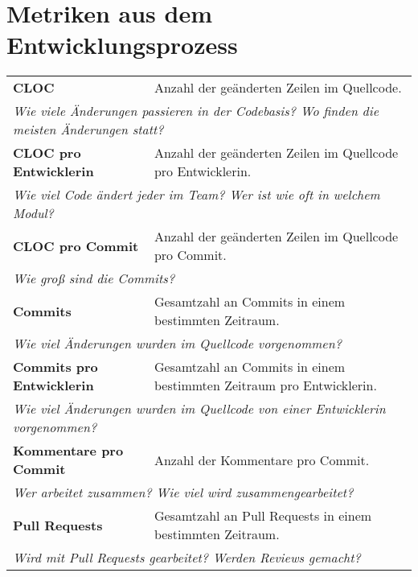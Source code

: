 \appendix
{}

\section{Metriken aus dem Entwicklungsprozess}\label{appendix:metrics}

\begin{table}[H]
    \centering
    \begin{tabular}{p{6.5cm}p{8cm}} \toprule
    \textbf{\ac{CLOC}} & Anzahl der geänderten Zeilen im Quellcode. \\
    \multicolumn{2}{p{14.5cm}}{\textit{Wie viele Änderungen passieren in der Codebasis? \newline Wo finden die meisten Änderungen statt?}} \\ \midrule
    \textbf{\ac{CLOC} pro Entwicklerin} & Anzahl der geänderten Zeilen im Quellcode pro Entwicklerin. \\ 
    \multicolumn{2}{p{14.5cm}}{\textit{Wie viel Code ändert jeder im Team? \newline  Wer ist wie oft in welchem Modul?}} \\ \midrule
    \textbf{\ac{CLOC} pro Commit} & Anzahl der geänderten Zeilen im Quellcode pro Commit. \\ 
    \multicolumn{2}{p{14.5cm}}{\textit{Wie groß sind die Commits?}} \\ \midrule
    \textbf{Commits} & Gesamtzahl an Commits in einem bestimmten Zeitraum. \\ 
    \multicolumn{2}{p{14.5cm}}{\textit{Wie viel Änderungen wurden im Quellcode vorgenommen?}} \\ \midrule
    \textbf{Commits pro Entwicklerin} & Gesamtzahl an Commits in einem bestimmten Zeitraum pro Entwicklerin. \\ 
    \multicolumn{2}{p{14.5cm}}{\textit{Wie viel Änderungen wurden im Quellcode von einer Entwicklerin vorgenommen?}} \\ \midrule
    \textbf{Kommentare pro Commit} & Anzahl der Kommentare pro Commit. \\ 
    \multicolumn{2}{p{14.5cm}}{\textit{Wer arbeitet zusammen? \newline Wie viel wird zusammengearbeitet?}} \\ \midrule
    \textbf{Pull Requests} & Gesamtzahl an Pull Requests in einem bestimmten Zeitraum. \\ 
    \multicolumn{2}{p{14.5cm}}{\textit{Wird mit Pull Requests gearbeitet? \newline Werden Reviews gemacht?}} \\ \midrule

\end{tabular}
\end{table}
